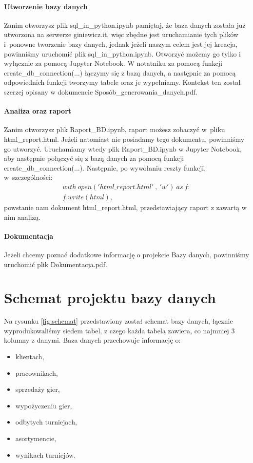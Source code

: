 \documentclass{article}
\theoremstyle{break}
\begin{document}
	\paragraph{Utworzenie bazy danych}
	Zanim otworzysz plik sql\_in\_python.ipynb pamiętaj, że baza danych została już utworzona na serwerze giniewicz.it, więc zbędne jest uruchamianie tych plików i~ponowne tworzenie bazy danych, jednak jeżeli naszym celem jest jej kreacja, powinniśmy uruchomić plik sql\_in\_python.ipynb. Otworzyć możemy go tylko i wyłącznie za pomocą Jupyter Notebook. W notatniku za pomocą funkcji create\_db\_connection($\dots$) łączymy się z bazą danych, a następnie za pomocą odpowiednich funkcji tworzymy tabele oraz je wypełniamy. Kontekst ten został szerzej opisany w dokumencie Sposób\_generowania\_danych.pdf. \\
	\paragraph{Analiza oraz raport}
	Zanim otworzysz plik Raport\_BD.ipynb, raport możesz zobaczyć w~pliku html\_report.html. Jeżeli natomiast nie posiadamy tego dokumentu, powinniśmy go utworzyć. Uruchamiamy wtedy plik Raport\_BD.ipynb w Jupyter Notebook, aby następnie połączyć się z bazą danych za pomocą funkcji create\_db\_connection($\dots$). Następnie, po wywołaniu reszty funkcji, w~szczególności:
	$$\begin{multlined}
			with \ open('html\_report.html'\ ,\ 'w') \ as \  f: \\
			f.write(html),
	\end{multlined}$$
	powstanie nam dokument html\_report.html, przedstawiający raport z zawartą w nim analizą. 
	\paragraph{Dokumentacja}
	Jeżeli chcemy poznać dodatkowe informację o projekcie Bazy danych, powinniśmy uruchomić plik Dokumentacja.pdf.
	
	\section{Schemat projektu bazy danych}
	Na rysunku \ref{fig:schemat} przedstawiony został schemat bazy danych, łącznie wyprodukowaliśmy siedem tabel, z czego każda tabela zawiera, co najmniej 3 kolumny z danymi. Baza danych przechowuje informację o:
	\begin{itemize}
		\item klientach,
		\item pracownikach,
		\item sprzedaży gier,
		\item wypożyczeniu gier,
		\item odbytych turniejach,
		\item asortymencie,
		\item wynikach turniejów.
	\end{itemize}
\end{document}
